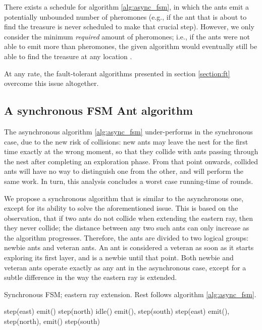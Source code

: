\begin{remark}\label{remark:pheromones}
There exists a schedule for algorithm \ref{alg:async_fsm},
in which the ants emit a potentially unbounded number
of pheromones (e.g., if the ant that is about to find the treasure is never scheduled to make 
that crucial step). However, we only consider the minimum \emph{required}
amount of pheromones; i.e., if the ants were not able to emit more than 
pheromones, the given algorithm would eventually still be able to find the treasure
at any location .

At any rate, the fault-tolerant algorithms presented in section \ref{section:ft} overcome this 
issue altogether.
\end{remark}

\subsection{A synchronous FSM Ant algorithm}\label{sec:sync_fsm}

The asynchronous algorithm \ref{alg:async_fsm} under-performs in the synchronous case,
due to the new risk of collisions: new ants may leave the nest for the first time exactly at the
 wrong moment,
 so that they collide with ants passing through the nest 
after completing an exploration phase. From that point onwards, collided ants will have
no way to distinguish one from the other, and will perform the same work.
In turn, this analysis concludes a worst case running-time of  rounds.

We propose a synchronous algorithm that is similar to the asynchronous one, except for its ability to 
solve the aforementioned issue. This is based on the observation, that if two ants do not collide when
 extending the eastern ray, then they never collide; the distance between any two such ants can only
 increase as the algorithm progresses. Therefore, the ants are divided to two logical groups:
newbie ants and veteran ants. An ant is considered a veteran as soon as it starts exploring its first layer,
and is a newbie until that point. Both newbie and veteran ants operate
 exactly as any ant in the asynchronous case, except for a subtle difference in the
way the eastern ray is extended.

\begin{algorithm}
  \caption{Synchronous FSM; eastern ray extension. Rest follows algorithm \ref{alg:async_fsm}.}
  \label{alg:sync_fsm}
  \begin{algorithmic}[1]
  \While{ == }
    \If{ == } 
      \State step(east)
       emit() \EndIIf {}
      \State step(north) 
      \State idle() 
       emit(),    \EndIIf
      \State step(south) 
    \Else {}
      \State step(east)
        \State emit(),   
        \State step(north), emit()
        \State step(south)
      \EndIf
    \EndIf
  \EndWhile
  \end{algorithmic}
\end{algorithm}

